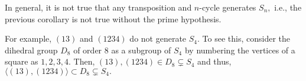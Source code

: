 \begin{rem}
	In general, it is not true that any transposition and $n$-cycle generates $S_n,$ i.e., the previous corollary is not true without the prime hypothesis. 

	For example, $(13)$ and $(1234)$ do not generate $S_4.$ To see this, consider the dihedral group $D_8$ of order $8$ as a subgroup of $S_4$ by numbering the vertices of a square as $1, 2, 3, 4.$ Then, $(13), (1234) \in D_8 \subsetneq S_4$ and thus, $\langle (13), (1234)\rangle \subset D_8 \subsetneq S_4.$
\end{rem}